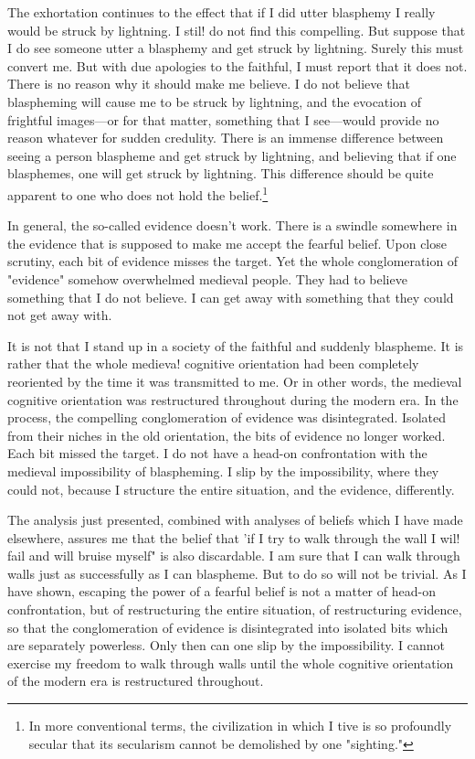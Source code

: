 \documentclass[10pt,twoside]{memoir}
\begin{document}
The exhortation continues to the effect that if I did utter blasphemy I 
really would be struck by lightning. I stil! do not find this compelling. But 
suppose that I do see someone utter a blasphemy and get struck by lightning. 
Surely this must convert me. But with due apologies to the faithful, I must 
report that it does not. There is no reason why it should make me believe. I 
do not believe that blaspheming will cause me to be struck by lightning, and 
the evocation of frightful images---or for that matter, something that I 
see---would provide no reason whatever for sudden credulity. There is an 
immense difference between seeing a person blaspheme and get struck by 
lightning, and believing that if one blasphemes, one will get struck by 
lightning. This difference should be quite apparent to one who does not hold 
the belief.\footnote{In more conventional terms, the civilization in which I tive is so 
profoundly secular that its secularism cannot be demolished by one 
"sighting."}

In general, the so-called evidence doesn't work. There is a swindle 
somewhere in the evidence that is supposed to make me accept the fearful 
belief. Upon close scrutiny, each bit of evidence misses the target. Yet the 
whole conglomeration of "evidence" somehow overwhelmed medieval 
people. They had to believe something that I do not believe. I can get away 
with something that they could not get away with. 

It is not that I stand up in a society of the faithful and suddenly 
blaspheme. It is rather that the whole medieva! cognitive orientation had 
been completely reoriented by the time it was transmitted to me. Or in other 
words, the medieval cognitive orientation was restructured throughout 
during the modern era. In the process, the compelling conglomeration of 
evidence was disintegrated. Isolated from their niches in the old orientation, 
the bits of evidence no longer worked. Each bit missed the target. I do not 
have a head-on confrontation with the medieval impossibility of 
blaspheming. I slip by the impossibility, where they could not, because I 
structure the entire situation, and the evidence, differently. 

The analysis just presented, combined with analyses of beliefs which I 
have made elsewhere, assures me that the belief that 'if I try to walk 
through the wall I wil! fail and will bruise myself" is also discardable. I am 
sure that I can walk through walls just as successfully as I can blaspheme. 
But to do so will not be trivial. As I have shown, escaping the power of a 
fearful belief is not a matter of head-on confrontation, but of restructuring 
the entire situation, of restructuring evidence, so that the conglomeration of 
evidence is disintegrated into isolated bits which are separately powerless. 
Only then can one slip by the impossibility. I cannot exercise my freedom to 
walk through walls until the whole cognitive orientation of the modern era is 
restructured throughout. 
\end{document}
